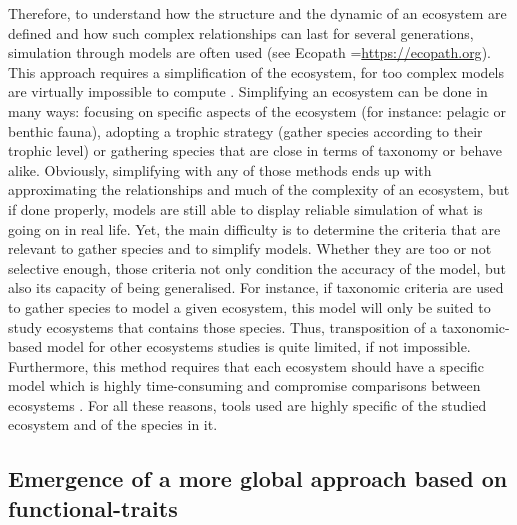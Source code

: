 Therefore, to understand how the structure and the dynamic of an ecosystem are defined and how such complex relationships can last for several generations, simulation through models are often used (see Ecopath =\url{https://ecopath.org}). This approach requires a simplification of the ecosystem, for too complex models are virtually impossible to compute \citep{albouy2011}. Simplifying an ecosystem can be done in many ways: focusing on specific aspects of the ecosystem (for instance: pelagic or benthic fauna), adopting a trophic strategy (gather species according to their trophic level) or gathering species that are close in terms of taxonomy or behave alike. Obviously, simplifying with any of those methods ends up with approximating the relationships and much of the complexity of an ecosystem, but if done properly, models are still able to display reliable simulation of what is going on in real life. Yet, the main difficulty is to determine the criteria that are relevant to gather species and to simplify models. Whether they are too or not selective enough, those criteria not only condition the accuracy of the model, but also its capacity of being generalised. For instance, if taxonomic criteria are used to gather species to model a given ecosystem, this model will only be suited to study ecosystems that contains those species. Thus, transposition of a taxonomic-based model for other ecosystems studies is quite limited, if not impossible. Furthermore, this method requires that each ecosystem should have a specific model which is highly time-consuming and compromise comparisons between ecosystems \citep{martini2020, mcgill2006}. For all these reasons, tools used are highly specific of the studied ecosystem and of the species in it. 


\subsection{Emergence of a more global approach based on functional-traits}

